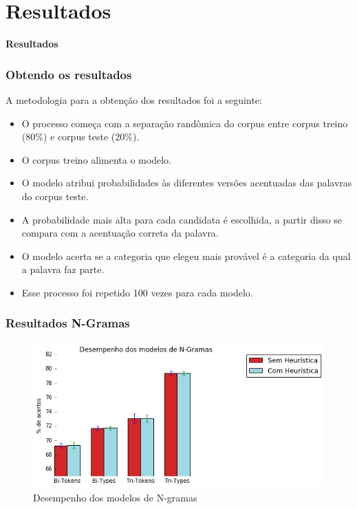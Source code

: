 \documentclass[xcolor=table]{beamer}
\begin{document}
	\section{Resultados}
	\begin{frame}
		\centering \textbf{Resultados}
	\end{frame}
	\begin{frame}
		\frametitle{Obtendo os resultados}
		A metodologia para a obtenção dos resultados foi a seguinte:
		\begin{itemize}
			\item O processo começa com a separação randômica do corpus entre corpus treino (80$\%$) e corpus teste (20$\%$).\\
			\item O corpus treino alimenta o modelo.\\ 
			\item O modelo atribui probabilidades às diferentes versões acentuadas das palavras do corpus teste.\\
			\item A probabilidade mais alta para cada candidata é escolhida, a partir disso se compara com a acentuação correta da palavra.\\
			\item O modelo acerta se a categoria que elegeu mais provável é a categoria da qual a palavra faz parte.\\
			\item Esse processo foi repetido 100 vezes para cada modelo.\\
		\end{itemize}
	\end{frame}
	\begin{frame}
		\frametitle{Resultados N-Gramas}
		\begin{figure}
\centering
\includegraphics[width=0.7\linewidth]{desempenhoN-gramas}
\caption{Desempenho dos modelos de N-gramas}
\label{fig:desempenhoN-gramas}
\end{figure}

	\end{frame}	
\end{document}
